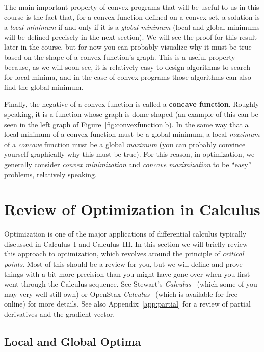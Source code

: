 \documentclass[11pt]{article}
\theoremstyle{definition} %
\begin{document}
The main important property of convex programs that will be useful to us in this course is the fact that, for a convex function defined on a convex set, a solution is a \textit{local minimum} if and only if it is a \textit{global minimum} (local and global minimums will be defined precisely in the next section). We will see the proof for this result later in the course, but for now you can probably visualize why it must be true based on the shape of a convex function's graph. This is a useful property because, as we will soon see, it is relatively easy to design algorithms to search for local minima, and in the case of convex programs those algorithms can also find the global minimum.

Finally, the negative of a convex function is called a \textbf{concave function}. Roughly speaking, it is a function whose graph is dome-shaped (an example of this can be seen in the left graph of Figure~\ref{fig:convexfunction}b). In the same way that a local minimum of a convex function must be a global minimum, a local \textit{maximum} of a \textit{concave} function must be a global \textit{maximum} (you can probably convince yourself graphically why this must be true). For this reason, in optimization, we generally consider \textit{convex minimization} and \textit{concave maximization} to be ``easy'' problems, relatively speaking.

\newpage
\section{Review of Optimization in Calculus}
\label{sec:calculus}

Optimization is one of the major applications of differential calculus typically discussed in Calculus~I and Calculus~III. In this section we will briefly review this approach to optimization, which revolves around the principle of \textit{critical points}. Most of this should be a review for you, but we will define and prove things with a bit more precision than you might have gone over when you first went through the Calculus sequence. See Stewart's \textit{Calculus}~\cite{stewart} (which some of you may very well still own) or OpenStax \textit{Calculus}~\cite{openstax1,openstax3} (which is available for free online) for more details. See also Appendix~\ref{app:partial} for a review of partial derivatives and the gradient vector.

\subsection{Local and Global Optima}
\label{subsec:localglobal}
\end{document}

